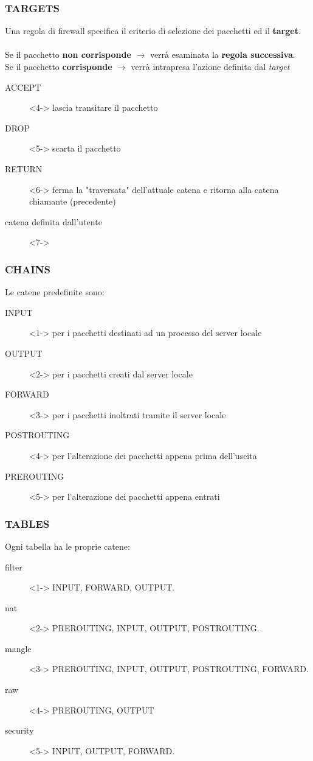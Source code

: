 \documentclass{beamer}
\begin{document}
\begin{frame}
    \frametitle{TARGETS}

    Una regola di firewall specifica il criterio di selezione dei pacchetti ed il \textbf{target}.
    \\~\\
     {Se il pacchetto \textbf{non corrisponde} $\rightarrow$ verrà esaminata la \textbf{regola successiva}.}\\
     {Se il pacchetto \textbf{corrisponde} $\rightarrow$ verrà intrapresa l'azione definita dal \textit{target}}
    \begin{description}
        \item[ACCEPT] <4-> lascia transitare il pacchetto
        \item[DROP] <5-> scarta il pacchetto
        \item[RETURN] <6-> ferma la "traversata" dell'attuale catena e ritorna alla catena chiamante (precedente)
        \item[catena definita dall'utente] <7->
    \end{description}
\end{frame}


\begin{frame}
    \frametitle{CHAINS}
    Le catene predefinite sono:
    \begin{description}
        \item[INPUT]<1-> per i pacchetti destinati ad un processo del server locale
        \item[OUTPUT]<2-> per i pacchetti creati dal server locale
        \item[FORWARD]<3-> per i pacchetti inoltrati tramite il server locale
        \item[POSTROUTING]<4-> per l'alterazione dei pacchetti appena prima dell'uscita
        \item[PREROUTING]<5-> per l'alterazione dei pacchetti appena entrati
    \end{description}
\end{frame}


\begin{frame}
    \frametitle{TABLES}
    Ogni tabella ha le proprie catene:
    \begin{description}
        \item[filter]<1-> INPUT, FORWARD, OUTPUT.
        \item[nat]<2-> PREROUTING, INPUT, OUTPUT, POSTROUTING.
        \item[mangle]<3-> PREROUTING, INPUT, OUTPUT, POSTROUTING, FORWARD.
        \item[raw]<4-> PREROUTING, OUTPUT
        \item[security]<5-> INPUT, OUTPUT, FORWARD.
    \end{description}
\end{frame}
\end{document}
